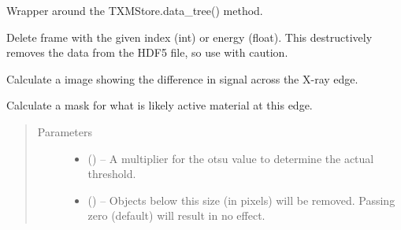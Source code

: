 \documentclass[letterpaper,10pt,english]{sphinxmanual}
\begin{document}
\begin{fulllineitems}
\begin{fulllineitems}
\label{\detokenize{xanespy:xanespy.xanes_frameset.XanesFrameset.data_tree}}
Wrapper around the TXMStore.data\_tree() method.

\end{fulllineitems}


\begin{fulllineitems}
\label{\detokenize{xanespy:xanespy.xanes_frameset.XanesFrameset.drop_frame}}
Delete frame with the given index (int) or energy (float). This
destructively removes the data from the HDF5 file, so use with
caution.

\end{fulllineitems}


\begin{fulllineitems}
\label{\detokenize{xanespy:xanespy.xanes_frameset.XanesFrameset.edge_jump}}
Calculate a image showing the difference in
signal across the X-ray edge.

\end{fulllineitems}


\begin{fulllineitems}
\label{\detokenize{xanespy:xanespy.xanes_frameset.XanesFrameset.edge_mask}}
Calculate a mask for what is likely active material at this
edge.
\begin{quote}\begin{description}
\item[{Parameters}] \leavevmode\begin{itemize}
\item {} 
 () -- A multiplier for the otsu value to determine
the actual threshold.

\item {} 
 () -- Objects below this size (in pixels) will be removed. Passing
zero (default) will result in no effect.


\end{itemize}
\end{description}
\end{quote}
\end{fulllineitems}
\end{fulllineitems}
\end{document}
